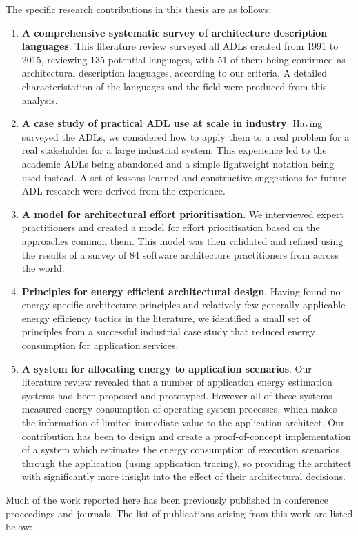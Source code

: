 The specific research contributions in this thesis are as follows:
\begin{enumerate}
	\item \textbf{A comprehensive systematic survey of architecture description languages}.  This literature review surveyed all ADLs created from 1991 to 2015, reviewing 135 potential languages, with 51 of them being confirmed as architectural description languages, according to our criteria.  A detailed characteristation of the languages and the field were produced from this analysis.
	\item \textbf{A case study of practical ADL use at scale in industry}.  Having surveyed the ADLs, we considered how to apply them to a real problem for a real stakeholder for a large industrial system.  This experience led to the academic ADLs being abandoned and a simple lightweight notation being used instead.  A set of lessons learned and constructive suggestions for future ADL research were derived from the experience.
	\item \textbf{A model for architectural effort prioritisation}.  We interviewed expert practitioners and created a model for effort prioritisation based on the approaches common them.  This model was then validated and refined using the results of a survey of 84 software architecture practitioners from across the world.
	\item \textbf{Principles for energy efficient architectural design}.  Having found no energy specific architecture principles and relatively few generally applicable energy efficiency tactics in the literature, we identified a small set of principles from a successful industrial case study that reduced energy consumption for application services.
	\item \textbf{A system for allocating energy to application scenarios}.  Our literature review revealed that a number of application energy estimation systems had been proposed and prototyped.  However all of these systems measured energy consumption of operating system processes, which makes the information of limited immediate value to the application architect.  Our contribution has been to design and create a proof-of-concept implementation of a system which estimates the energy consumption of execution scenarios through the application (using application tracing), so providing the architect with significantly more insight into the effect of their architectural decisions.
\end{enumerate}

Much of the work reported here has been previously published in conference proceedings and journals. The list of publications arising from this work are listed below:

